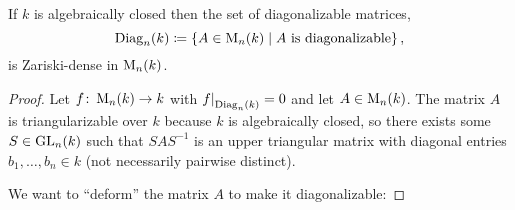 \begin{proposition}
  \label{proposition: diagonalizable matrices are dense for algebraically closed}
  If $k$ is algebraically closed then the set of diagonalizable matrices,
  \[
              \operatorname{Diag}_n(k)
    \coloneqq \{
                A \in \operatorname{M}_n(k)
              \mid
                \text{$A$ is diagonalizable}
              \} \,,
  \]
  is Zariski-dense in $\operatorname{M}_n(k)$.
\end{proposition}
\begin{proof}
  Let $f \colon \operatorname{M}_n(k) \to k$ with $\restrict{f}{\Diag_n(k)} = 0$ and let $A \in \operatorname{M}_n(k)$.
  The matrix $A$ is triangularizable over $k$ because $k$ is algebraically closed, so there exists some $S \in \operatorname{GL}_n(k)$ such that $S A S^{-1}$ is an upper triangular matrix with diagonal entries $b_1, \dotsc, b_n \in k$ (not necessarily pairwise distinct).
  
  We want to \enquote{deform} the matrix $A$ to make it diagonalizable:
  

\end{proof}
